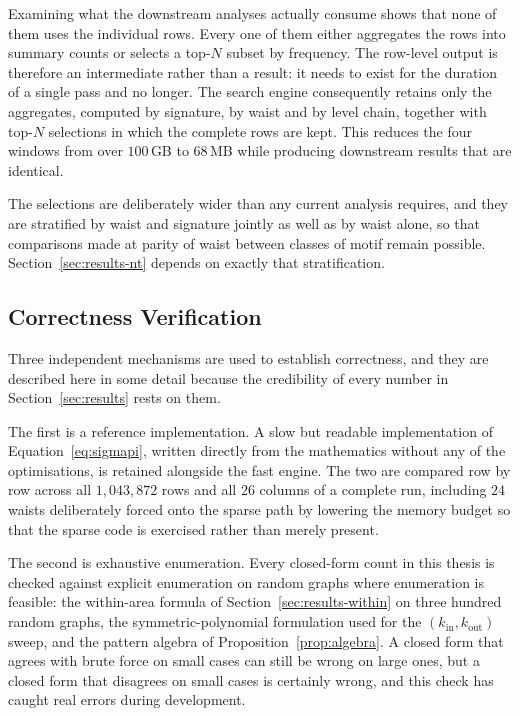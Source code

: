 \documentclass[12pt,a4paper,oneside]{article}
\theoremstyle{definition}
\theoremstyle{plain}
\newcommand{\kin}{k_{\mathrm{in}}}
\newcommand{\kout}{k_{\mathrm{out}}}
\begin{document}
Examining what the downstream analyses actually consume shows that none of
them uses the individual rows. Every one of them either aggregates the rows
into summary counts or selects a top-$N$ subset by frequency. The row-level
output is therefore an intermediate rather than a result: it needs to exist
for the duration of a single pass and no longer. The search engine
consequently retains only the aggregates, computed by signature, by waist
and by level chain, together with top-$N$ selections in which the complete
rows are kept. This reduces the four windows from over $100$\,GB to
$68$\,MB while producing downstream results that are identical.

The selections are deliberately wider than any current analysis requires,
and they are stratified by waist and signature jointly as well as by waist
alone, so that comparisons made at parity of waist between classes of motif
remain possible. Section~\ref{sec:results-nt} depends on exactly that
stratification.

\subsection{Correctness Verification}
\label{sec:verification}

Three independent mechanisms are used to establish correctness, and they are
described here in some detail because the credibility of every number in
Section~\ref{sec:results} rests on them.

The first is a reference implementation. A slow but readable implementation
of Equation~\eqref{eq:sigmapi}, written directly from the mathematics
without any of the optimisations, is retained alongside the fast engine. The
two are compared row by row across all $1{,}043{,}872$ rows and all $26$
columns of a complete run, including $24$ waists deliberately forced onto
the sparse path by lowering the memory budget so that the sparse code is
exercised rather than merely present.

The second is exhaustive enumeration. Every closed-form count in this thesis
is checked against explicit enumeration on random graphs where enumeration
is feasible: the within-area formula of
Section~\ref{sec:results-within} on three hundred random graphs, the
symmetric-polynomial formulation used for the $(\kin, \kout)$ sweep, and the
pattern algebra of Proposition~\ref{prop:algebra}. A closed form that agrees
with brute force on small cases can still be wrong on large ones, but a
closed form that disagrees on small cases is certainly wrong, and this check
has caught real errors during development.
\end{document}
